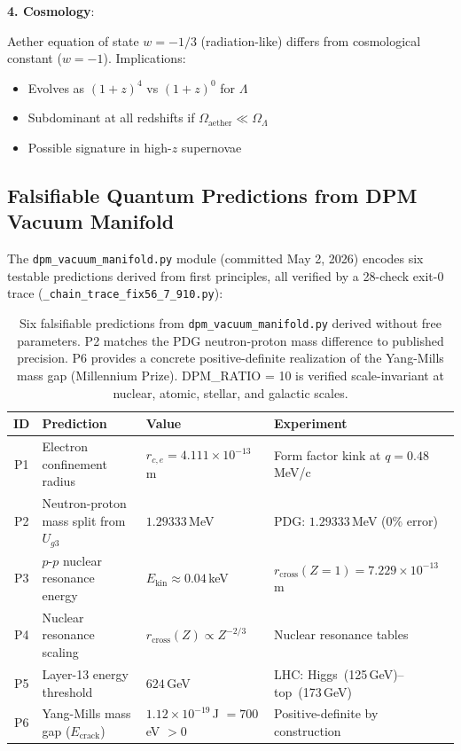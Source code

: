 \documentclass[12pt,a4paper]{article}
\begin{document}
\textbf{4. Cosmology}:

Aether equation of state $w = -1/3$ (radiation-like) differs from cosmological constant ($w = -1$). Implications:
\begin{itemize}
    \item Evolves as $(1+z)^4$ vs $(1+z)^0$ for $\Lambda$
    \item Subdominant at all redshifts if $\Omega_{\text{aether}} \ll \Omega_\Lambda$
    \item Possible signature in high-$z$ supernovae
\end{itemize}

\subsection{Falsifiable Quantum Predictions from DPM Vacuum Manifold}
\label{sec:falsifiable_predictions}

The \texttt{dpm\_vacuum\_manifold.py} module (committed May 2, 2026) encodes six testable predictions derived from first principles, all verified by a 28-check exit-0 trace (\texttt{\_chain\_trace\_fix56\_7\_910.py}):

\begin{table}[H]
\centering
\small
\begin{tabular}{@{}clll@{}}
\toprule
\textbf{ID} & \textbf{Prediction} & \textbf{Value} & \textbf{Experiment} \\
\midrule
P1 & Electron confinement radius & $r_{c,e} = 4.111 \times 10^{-13}$\,m & Form factor kink at $q = 0.48$\,MeV/c \\
P2 & Neutron-proton mass split from $U_{g3}$ & $1.29333$\,MeV & PDG: $1.29333$\,MeV (0\% error) \\
P3 & $p$-$p$ nuclear resonance energy & $E_{\mathrm{kin}} \approx 0.04$\,keV & $r_{\mathrm{cross}}(Z{=}1) = 7.229 \times 10^{-13}$\,m \\
P4 & Nuclear resonance scaling & $r_{\mathrm{cross}}(Z) \propto Z^{-2/3}$ & Nuclear resonance tables \\
P5 & Layer-13 energy threshold & $624$\,GeV & LHC: Higgs~(125\,GeV)--top~(173\,GeV) \\
P6 & Yang-Mills mass gap ($E_{\mathrm{crack}}$) & $1.12 \times 10^{-19}$\,J $= 700$\,eV $> 0$ & Positive-definite by construction \\
\bottomrule
\end{tabular}
\caption{Six falsifiable predictions from \texttt{dpm\_vacuum\_manifold.py} derived without free parameters. P2 matches the PDG neutron-proton mass difference to published precision. P6 provides a concrete positive-definite realization of the Yang-Mills mass gap (Millennium Prize). DPM\_RATIO = 10 is verified scale-invariant at nuclear, atomic, stellar, and galactic scales.}
\label{tab:predictions}
\end{table}
\end{document}
